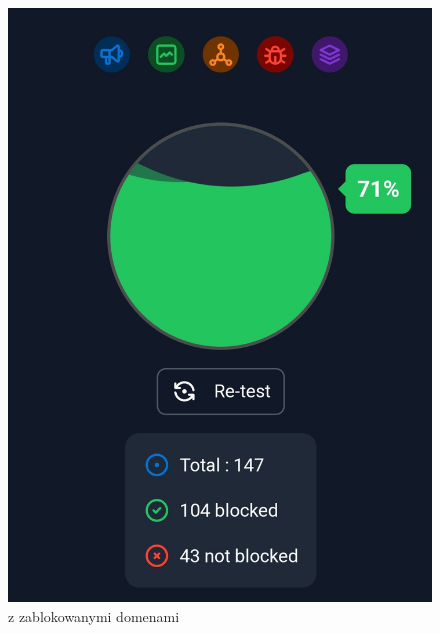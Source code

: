 \documentclass{article}
\begin{document}
\begin{figure}[H]
  \centering
  \begin{minipage}{0.5\textwidth}
    \centering
    \includegraphics[scale=0.2]{zBlokem1.jpg}
    \caption{z zablokowanymi domenami}
  \end{minipage}\hfill
  \begin{minipage}{0.5\textwidth}
    \centering

\end{minipage}
\end{figure}
\end{document}
